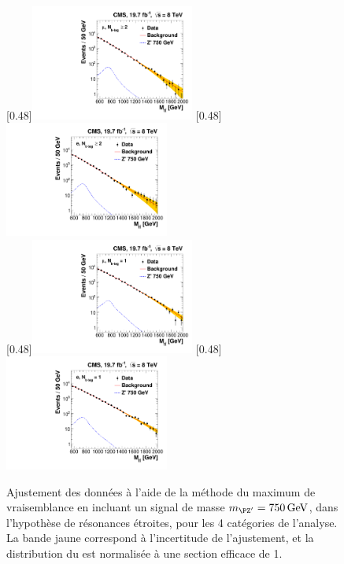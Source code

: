 \begin{figure}[tbp] \centering
    [0.48\textwidth]{\includegraphics[width=0.48\textwidth,angle=-90,origin=c]{chapitre7/figs/likelihood_fit_mu_2b.pdf}} \hfill
    [0.48\textwidth]{\includegraphics[width=0.48\textwidth,angle=-90,origin=c]{chapitre7/figs/likelihood_fit_e_2b.pdf}} \\
    [0.48\textwidth]{\includegraphics[width=0.48\textwidth,angle=-90,origin=c]{chapitre7/figs/likelihood_fit_mu_1b.pdf}} \hfill
    [0.48\textwidth]{\includegraphics[width=0.48\textwidth,angle=-90,origin=c]{chapitre7/figs/likelihood_fit_e_1b.pdf}}
    \caption{Ajustement des données à l'aide de la méthode du maximum de vraisemblance en incluant un signal de masse $\mzp = \SI{750}{\GeV}$, dans l'hypothèse de résonances étroites, pour les 4 catégories de l'analyse. La bande jaune correspond à l'incertitude de l'ajustement, et la distribution du \zprime est normalisée à une section efficace de \SI{1}{\pb}.}
    \label{fig:likelihood_fit}
\end{figure}

